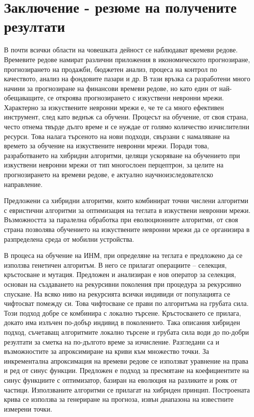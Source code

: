 \chapter*{Заключение - резюме на получените резултати}

В почти всички области на човешката дейност се наблюдават времеви редове. Времевите редове намират различни приложения в икономическото прогнозиране, прогнозирането на продажби, бюджетен анализ, процеса на контрол по качеството, анализ на фондовите пазари и др. В тази връзка са разработени много начини за прогнозиране на финансови времеви редове, но като един от най-обещаващите, се откроява прогнозирането с изкуствени невронни мрежи. Характерно за изкуствените невронни мрежи е, че те са много ефективен инструмент, след като веднъж са обучени. Процесът на обучение, от своя страна, често отнема твърде дълго време и се нуждае от голямо количество изчислителни ресурси. Това налага търсеното на нови подходи, свързани с намаляване на времето за обучение на изкуствените невронни мрежи. Поради това, разработването на хибридни алгоритми, целящи ускоряване на обучението при изкуствени невронни мрежи от тип многослоен перцептрон, за целите на прогнозирането на времеви редове, е актуално научноизследователско направление.

Предложени са хибридни алгоритми, които комбинират точни числени алгоритми с евристични алгоритми за оптимизация на теглата в изкуствени невронни мрежи. Възможността за паралелна обработка при еволюционните алгоритми, от своя страна позволява обучението на изкуствените невронни мрежи да се организира в разпределена среда от мобилни устройства.

В процеса на обучение на ИНМ, при определяне на теглата е предложено да се използва генетичен алгоритъм. В него се прилагат операциите – селекция, кръстосване и мутация. Предложен и анализиран е нов оператор за селекция, основан на създаването на рекурсивни поколения при процедура за рекурсивно спускане. На всяко ниво на рекурсията всички индивиди от популацията се чифтосват помежду си. Това чифтосване се прави по алгоритъма на грубата сила. Този подход добре се комбинира с локално търсене. Кръстосването се прилага, докато има излъчен по-добър индивид в поколението. Така описания хибриден подход, съчетаващ алгоритмите локално търсене и грубата сила води до по-добри резултати за сметка на по-дългото време за изчисление. Разгледани са и възможностите за апроксимиране на криви към множество точки. За инкрементална апроксимация на времеви редове се използват уравнение на права и ред от синус функции. Предложен е подход за пресмятане на коефициентите на синус функциите с оптимизатор, базиран на еволюция на разликите и рояк от частици. Използваните алгоритми се прилагат на хибриден принцип. Построената крива се използва за генериране на прогноза, извън диапазона на известните измерени точки.

